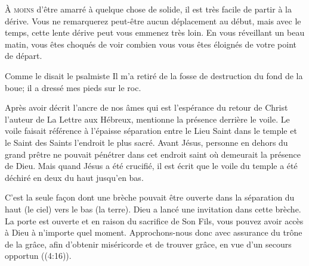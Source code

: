 

\lettrine{À}{ moins} d'être amarré à quelque chose de solide,
 il est très facile de partir à la dérive.
 Vous ne remarquerez peut-être aucun déplacement au début,
 mais avec le temps, cette lente dérive peut vous emmenez très loin.
 En vous réveillant un beau matin, vous êtes choqués de voir
 combien vous vous êtes éloignés de votre point de départ. 

Comme le disait le psalmiste\frcolon{} 
 \Og Il m'a retiré de la fosse de destruction du fond de la boue;
 il a dressé mes pieds sur le roc. \Fg{}


Après avoir décrit l'ancre de nos âmes
 \ocadr qui est l'espérance du retour de Christ \fcadr{}
 l'auteur de La Lettre aux Hébreux, mentionne la présence derrière le voile.
 Le voile faisait référence à l'épaisse séparation entre le Lieu Saint
 dans le temple et le Saint des Saints \ocadr l'endroit le plus sacré.
 Avant Jésus, personne en dehors du grand prêtre 
 ne pouvait pénétrer
 dans cet endroit saint où demeurait la présence de Dieu.
 Mais quand Jésus a été crucifié, il est écrit que le voile du temple
 a été déchiré en deux du haut jusqu'en bas.

C'est la seule fa\c{c}on dont une brèche pouvait être ouverte
 dans la séparation \ocadr du haut (le ciel) vers le bas (la terre).
 Dieu a lancé une invitation dans cette brèche. La porte est ouverte
 et en raison du sacrifice de Son Fils, vous pouvez avoir accès à Dieu
 à n'importe quel moment.
 \Og Approchons-nous donc avec assurance du trône de la grâce,
 afin d'obtenir miséricorde et de trouver grâce,
 en vue d'un secours opportun \Fg{} ((4:16)). 

\dvrule





